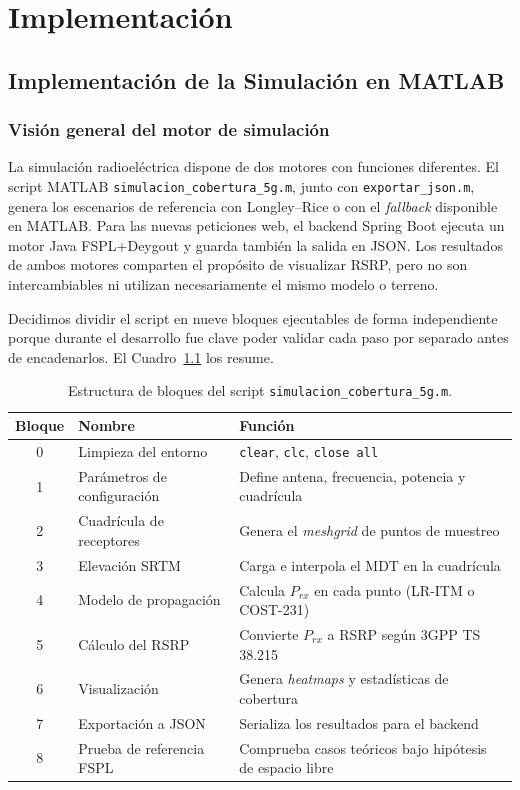 \chapter{Implementación}
\label{cap:capitulo4}

\section{Implementación de la Simulación en MATLAB}
\label{sec:impl_matlab}

\subsection{Visión general del motor de simulación}
\label{sec:matlab_vision}

La simulación radioeléctrica dispone de dos motores con funciones diferentes. El script
MATLAB \texttt{simulacion\_cobertura\_5g.m}, junto con
\texttt{exportar\_json.m}, genera los escenarios de referencia con Longley--Rice o con
el \textit{fallback} disponible en MATLAB. Para las nuevas peticiones web, el backend
Spring Boot ejecuta un motor Java FSPL+Deygout y guarda también la salida en JSON. Los
resultados de ambos motores comparten el propósito de visualizar RSRP, pero no son
intercambiables ni utilizan necesariamente el mismo modelo o terreno.

Decidimos dividir el script en nueve bloques ejecutables de forma independiente porque
durante el desarrollo fue clave poder validar cada paso por separado antes de encadenarlos.
El Cuadro~\ref{tab:bloques_matlab} los resume.

\begin{table}[H]
\centering
\caption{Estructura de bloques del script \texttt{simulacion\_cobertura\_5g.m}.}
\label{tab:bloques_matlab}
\small
\begin{tabularx}{\textwidth}{|c|l|X|}
\hline
\textbf{Bloque} & \textbf{Nombre} & \textbf{Función} \\
\hline
0 & Limpieza del entorno        & \texttt{clear}, \texttt{clc}, \texttt{close all} \\
1 & Parámetros de configuración & Define antena, frecuencia, potencia y cuadrícula \\
2 & Cuadrícula de receptores    & Genera el \textit{meshgrid} de puntos de muestreo \\
3 & Elevación SRTM              & Carga e interpola el MDT en la cuadrícula \\
4 & Modelo de propagación       & Calcula $P_{rx}$ en cada punto (LR-ITM o COST-231) \\
5 & Cálculo del RSRP            & Convierte $P_{rx}$ a RSRP según 3GPP TS 38.215 \\
6 & Visualización               & Genera \textit{heatmaps} y estadísticas de cobertura \\
7 & Exportación a JSON          & Serializa los resultados para el backend \\
8 & Prueba de referencia FSPL  & Comprueba casos teóricos bajo hipótesis de espacio libre \\
\hline
\end{tabularx}
\end{table}

